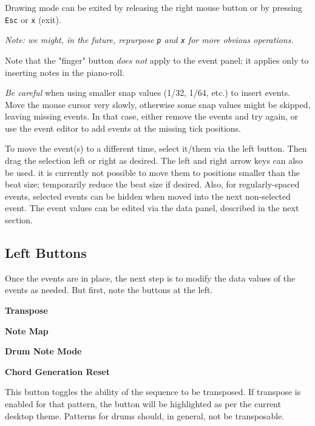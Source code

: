    Drawing mode can be exited by releasing the right mouse button or
   by pressing \texttt{Esc} or \texttt{x} (exit).

   \textsl{Note: we might, in the future, repurpose \texttt{p} and
   \texttt{x} for more obvious operations.}

   Note that the "finger" button \textsl{does not} apply to the event panel;
   it applies only to inserting notes in the piano-roll.

   \textsl{Be careful}
   when using smaller snap values (1/32, 1/64, etc.) to insert events.
   Move the mouse cursor very slowly, otherwise some snap values might be
   skipped, leaving missing events.  In that case, either remove the events and
   try again, or use the event editor to add events at the missing tick
   positions.

   To move the event(s) to a different time, select it/them via the left
   button.  Then drag the selection left or right as desired.
   The left and right arrow keys can also be used.
   it is currently not possible to move them to positions smaller than the
   beat size; temporarily reduce the beat size if desired.
   Also, for regularly-spaced events, selected events can be hidden when moved
   into the next non-selected event.
   The event values can be edited via the data panel, described in the next
   section.

\subsection{Left Buttons}
\label{subsec:pattern_editor_left_buttons}

   Once the events are in place, the next step is to modify the
   data values of the events as needed.
   But first, note the buttons at the left.

   \begin{enumber}
      \item \textbf{Transpose}
      \item \textbf{Note Map}
      \item \textbf{Drum Note Mode}
      \item \textbf{Chord Generation Reset}
   \end{enumber}

   \setcounter{ItemCounter}{0}      %

   This button toggles the ability of the sequence to be transposed.
   If transpose is enabled for that pattern, the button will be highlighted as
   per the current desktop theme.  Patterns for drums should, in general, not
   be transposable.

